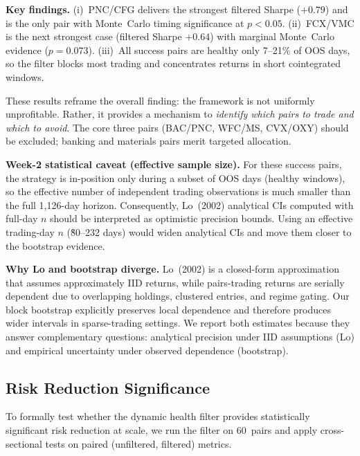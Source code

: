 \documentclass{ieeeaccess}
\begin{document}
\textbf{Key findings.}
(i)~PNC/CFG delivers the strongest filtered Sharpe ($+0.79$) and is the only pair with Monte~Carlo timing significance at $p < 0.05$.
(ii)~FCX/VMC is the next strongest case (filtered Sharpe $+0.64$) with marginal Monte~Carlo evidence ($p = 0.073$).
(iii)~All success pairs are healthy only 7--21\% of OOS days, so the filter blocks most trading and concentrates returns in short cointegrated windows.

These results reframe the overall finding: the framework is not uniformly unprofitable.
Rather, it provides a mechanism to \emph{identify which pairs to trade and which to avoid}.
The core three pairs (BAC/PNC, WFC/MS, CVX/OXY) should be excluded; banking and materials pairs merit targeted allocation.

\textbf{Week-2 statistical caveat (effective sample size).}
For these success pairs, the strategy is in-position only during a subset of OOS days (healthy windows), so the effective number of independent trading observations is much smaller than the full 1,126-day horizon.
Consequently, Lo~(2002) analytical CIs computed with full-day $n$ should be interpreted as optimistic precision bounds.
Using an effective trading-day $n$ (\~80--232 days) would widen analytical CIs and move them closer to the bootstrap evidence.

\textbf{Why Lo and bootstrap diverge.}
Lo~(2002) is a closed-form approximation that assumes approximately IID returns, while pairs-trading returns are serially dependent due to overlapping holdings, clustered entries, and regime gating.
Our block bootstrap explicitly preserves local dependence and therefore produces wider intervals in sparse-trading settings.
We report both estimates because they answer complementary questions: analytical precision under IID assumptions (Lo) and empirical uncertainty under observed dependence (bootstrap).

\subsection{Risk Reduction Significance}
\label{sec:wilcoxon}

To formally test whether the dynamic health filter provides statistically significant risk reduction at scale, we run the filter on 60~pairs and apply cross-sectional tests on paired (unfiltered, filtered) metrics.


\end{document}
